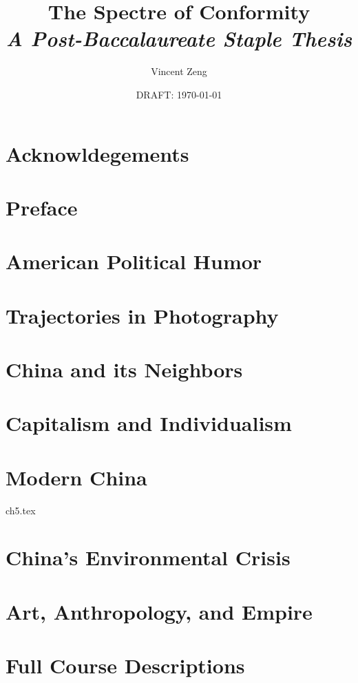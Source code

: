 \documentclass{book}[10pt]
\title{\Huge{The Spectre of Conformity\\
\huge{\textit{A Post-Baccalaureate Staple Thesis}}}}
\author{Vincent Zeng}
\date{DRAFT: \today}
\begin{document}
\maketitle


\frontmatter
\chapter{Acknowldegements}


\tableofcontents

\blankpage
\blankpage

\chapter{Preface}


\blankpage
\blankpage

\mainmatter

\chapter{American Political Humor}


\chapter{Trajectories in Photography}


\chapter{China and its Neighbors}


\chapter{Capitalism and Individualism}


\chapter{Modern China}
 {ch5.tex}

\chapter{China's Environmental Crisis}


\chapter{Art, Anthropology, and Empire}


\appendix

\chapter{Full Course Descriptions}


\end{document}
